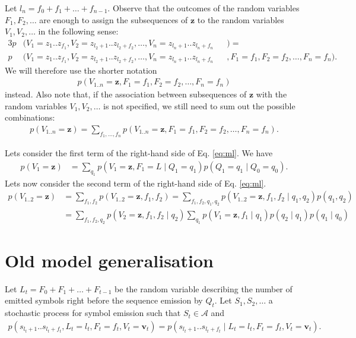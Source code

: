 \documentclass[a4paper]{article}
\theoremstyle{definition}
\theoremstyle{definition}
\theoremstyle{definition}
\newcommand{\gv}{\;|\;}
\begin{document}
Let $l_n=f_0+f_1+\dots+f_{n-1}$.
Observe that the outcomes of the random variables $F_1, F_2, \dots$ are enough to assign the subsequences
of $\mathbf z$ to the random variables $V_1, V_2, \dots$ in the following sense:
\begin{alignat*}{3}
    p&(V_1=z_1 .. z_{f_1}, V_2=z_{l_2+1} .. z_{l_2+f_2}, \dots, V_n=z_{l_n+1} .. z_{l_n+f_n}&&) =\\
    p&(V_1=z_1 .. z_{f_1}, V_2=z_{l_2+1} .. z_{l_2+f_2}, \dots, V_n=z_{l_n+1} .. z_{l_n+f_n}&&,
        F_1=f_1, F_2=f_2, \dots, F_n=f_n).
\end{alignat*}
We will therefore use the shorter notation
\begin{align*}
    p(V_{1..n}=\mathbf z, F_1=f_1, F_2=f_2, \dots, F_n=f_n)
\end{align*}
instead.
Also note that, if the association between subsequences of $\mathbf z$ with the random variables $V_1, V_2, \dots$ is
not specified, we still need to sum out the possible combinations:
\begin{align*}
    p(V_{1..n}=\mathbf z) = \sum_{f_1,\dots,f_n} p(V_{1..n}=
    \mathbf z, F_1=f_1, F_2=f_2, \dots, F_n=f_n).
\end{align*}

Lets consider the first term of the right-hand side of Eq. \eqref{eq:ml}.
We have
\begin{align*}
    p(V_1=\mathbf z)
        &= \sum_{q_1} p(V_1=\mathbf z, F_1=L \gv Q_1=q_1) p(Q_1=q_1 \gv Q_0=q_0).
\end{align*}
Lets now consider the second term of the right-hand side of Eq. \eqref{eq:ml}.
\begin{align*}
    p(V_{1..2}=\mathbf z)
        &= \sum_{f_1,f_2} p(V_{1..2}=\mathbf z, f_1, f_2)
        = \sum_{f_1,f_2,q_1,q_2} p(V_{1..2}=\mathbf z, f_1, f_2 \gv q_1, q_2) p(q_1, q_2) \\
        &= \sum_{f_1,f_2,q_2} p(V_2=\mathbf z, f_1, f_2 \gv q_2) \sum_{q_1} p(V_1=\mathbf z, f_1 \gv q_1) p(q_2 \gv q_1) p(q_1 \gv q_0)
\end{align*}


\newpage
\newpage

\section{Old model generalisation}

Let $L_t=F_0+F_1+\dots + F_{t-1}$ be the random variable describing the number of emitted symbols right
before the sequence emission by $Q_t$.
Let $S_1, S_2, \dots$ a stochastic process for symbol emission such that $S_t\in\mathcal A$
and
\begin{align*}
    p(s_{l_t+1} .. s_{l_t+f_t}, L_t=l_t, F_t=f_t, V_t=\mathbf v_t)
        = p(s_{l_t+1} .. s_{l_t+f_t}\gv L_t=l_t, F_t=f_t, V_t=\mathbf v_t).
\end{align*}
\end{document}
